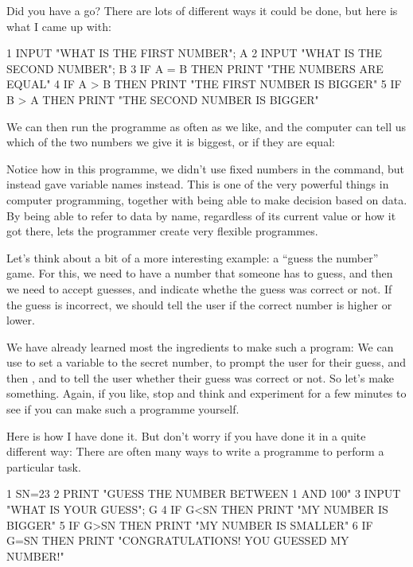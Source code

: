 \pagebreak

Did you have a go?  There are lots of different ways it could be done,
but here is what I came up with:

\begin{screenoutput}
1 INPUT "WHAT IS THE FIRST NUMBER"; A
2 INPUT "WHAT IS THE SECOND NUMBER"; B
3 IF A = B THEN PRINT "THE NUMBERS ARE EQUAL"
4 IF A > B THEN PRINT "THE FIRST NUMBER IS BIGGER"
5 IF B > A THEN PRINT "THE SECOND NUMBER IS BIGGER"
\end{screenoutput}

We can then run the programme as often as we like, and the computer
can tell us which of the two numbers we give it is biggest, or if they
are equal:


Notice how in this programme, we didn't use fixed numbers in the
 command, but instead gave variable names instead.  This is
one of the very powerful things in computer programming, together
with being able to make decision based on data. By being able to refer
to data by name, regardless of its current value or how it got there,
lets the programmer create very flexible programmes.

Let's think about a bit of a more interesting example: a ``guess the
number'' game.
For this, we need to have a number that someone has to guess, and then
we need to accept guesses, and indicate whethe the guess was correct
or not. If the guess is incorrect, we should tell the user if the
correct number is higher or lower.

We have already learned most the ingredients to make such a program: We
can use  to set a variable to the secret number, 
to prompt the user for their guess, and then ,  and
 to tell the user whether their guess was correct or not.
So let's make something. Again, if you like, stop and think and
experiment for a few minutes to see if you can make such a programme
yourself.

Here is how I have done it.  But don't worry if you have done it in a
quite different way: There are often many ways to write a programme to
perform a particular task.

\begin{screenoutput}
1 SN=23
2 PRINT "GUESS THE NUMBER BETWEEN 1 AND 100"
3 INPUT "WHAT IS YOUR GUESS"; G
4 IF G<SN THEN PRINT "MY NUMBER IS BIGGER"
5 IF G>SN THEN PRINT "MY NUMBER IS SMALLER"
6 IF G=SN THEN PRINT "CONGRATULATIONS! YOU GUESSED MY NUMBER!"
\end{screenoutput}

